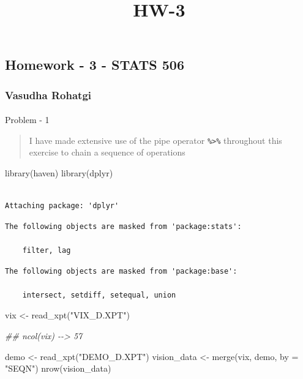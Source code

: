 \documentclass[
  12pt,
]{article}
\title{HW-3}
\author{}
\date{}
\makeatletter
\let\oldparagraph\paragraph
\renewcommand{\paragraph}{
    \@ifstar
      \xxxParagraphStar
      \xxxParagraphNoStar
  }
\newcommand{\xxxParagraphStar}[1]{\oldparagraph*{#1}\mbox{}}
\newcommand{\xxxParagraphNoStar}[1]{\oldparagraph{#1}\mbox{}}
\newenvironment{Shaded}{\begin{snugshade}}{\end{snugshade}}
\newcommand{\AttributeTok}[1]{\textcolor[rgb]{0.40,0.45,0.13}{#1}}
\newcommand{\DocumentationTok}[1]{\textcolor[rgb]{0.37,0.37,0.37}{\textit{#1}}}
\newcommand{\FunctionTok}[1]{\textcolor[rgb]{0.28,0.35,0.67}{#1}}
\newcommand{\NormalTok}[1]{\textcolor[rgb]{0.00,0.23,0.31}{#1}}
\newcommand{\OtherTok}[1]{\textcolor[rgb]{0.00,0.23,0.31}{#1}}
\newcommand{\StringTok}[1]{\textcolor[rgb]{0.13,0.47,0.30}{#1}}
\makeatother
\begin{document}
\maketitle


\subsection{Homework - 3 - STATS 506}\label{homework---3---stats-506}

\subsubsection{Vasudha Rohatgi}\label{vasudha-rohatgi}

\paragraph{Problem - 1}\label{problem---1}

\begin{quote}
I have made extensive use of the pipe operator
\textbf{\texttt{\%\textgreater{}\%}} throughout this exercise to chain a
sequence of operations
\end{quote}

\begin{Shaded}
\begin{Highlighting}[]
\FunctionTok{library}\NormalTok{(haven)}
\FunctionTok{library}\NormalTok{(dplyr)}
\end{Highlighting}
\end{Shaded}

\begin{verbatim}

Attaching package: 'dplyr'
\end{verbatim}

\begin{verbatim}
The following objects are masked from 'package:stats':

    filter, lag
\end{verbatim}

\begin{verbatim}
The following objects are masked from 'package:base':

    intersect, setdiff, setequal, union
\end{verbatim}

\begin{Shaded}
\begin{Highlighting}[]
\NormalTok{vix }\OtherTok{\textless{}{-}} \FunctionTok{read\_xpt}\NormalTok{(}\StringTok{"VIX\_D.XPT"}\NormalTok{)}

\DocumentationTok{\#\# ncol(vix) {-}{-}\textgreater{} 57}

\NormalTok{demo }\OtherTok{\textless{}{-}} \FunctionTok{read\_xpt}\NormalTok{(}\StringTok{"DEMO\_D.XPT"}\NormalTok{)}
\NormalTok{vision\_data }\OtherTok{\textless{}{-}} \FunctionTok{merge}\NormalTok{(vix, demo, }\AttributeTok{by =} \StringTok{"SEQN"}\NormalTok{)}
\FunctionTok{nrow}\NormalTok{(vision\_data)}
\end{Highlighting}
\end{Shaded}
\end{document}
